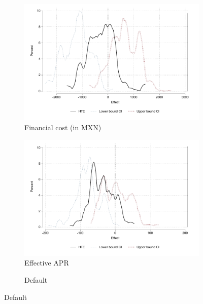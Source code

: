 \documentclass[oneside,11pt]{article}
\begin{document}
\begin{figure}[H]
     \caption{Heterogeneous Treatment Effects}
    \label{heterogeneous_effects}
    \begin{center}
    \begin{subfigure}{.45\textwidth}
      \caption{Financial cost (in MXN)}
        \centering
        \includegraphics[width=\textwidth]{Figuras/he_dist_fc_admin_pro_2.pdf}
    \end{subfigure}
     \begin{subfigure}{0.45\textwidth}
    \caption{Effective APR}
       \centering
      \includegraphics[width=\textwidth]{Figuras/he_dist_apr_pro_2.pdf}
    \end{subfigure}
     \begin{subfigure}{0.45\textwidth}
    \caption{Default}
       \centering

\end{subfigure}
\end{center}
\end{figure}
\end{document}

